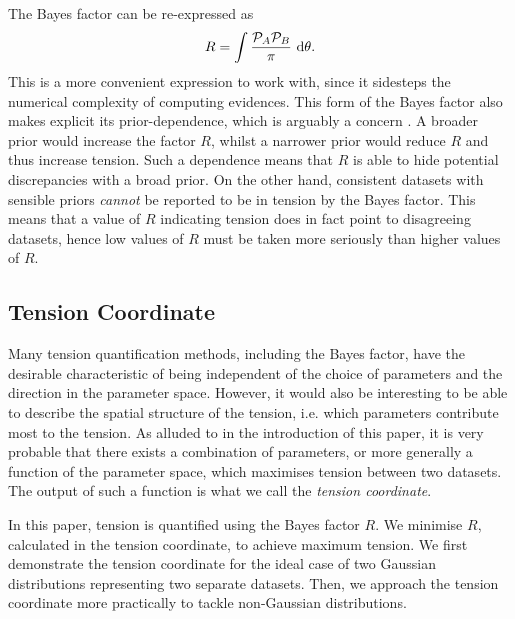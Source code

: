 \documentclass[%
 reprint,
 amsmath,amssymb,
 aps,
]{revtex4-2}
\begin{document}
The Bayes factor can be re-expressed as 
\begin{equation}
    R = \int \frac{\mathcal{P}_A \mathcal{P}_B}{\pi} \ \rm{d}\theta.
\end{equation}
This is a more convenient expression to work with, since it sidesteps the numerical complexity of computing evidences. This form of the Bayes factor also makes explicit its prior-dependence, which is arguably a concern \cite{Handley2019}. A broader prior would increase the factor $R$, whilst a narrower prior would reduce $R$ and thus increase tension. Such a dependence means that $R$ is able to hide potential discrepancies with a broad prior. On the other hand, consistent datasets with sensible priors \textit{cannot} be reported to be in tension by the Bayes factor. This means that a value of $R$ indicating tension does in fact point to disagreeing datasets, hence low values of $R$ must be taken more seriously than higher values of $R$.


\subsection{Tension Coordinate}

Many tension quantification methods, including the Bayes factor, have the desirable characteristic of being independent of the choice of parameters and the direction in the parameter space. However, it would also be interesting to be able to describe the spatial structure of the tension, i.e. which parameters contribute most to the tension. As alluded to in the introduction of this paper, it is very probable that there exists a combination of parameters, or more generally a function of the parameter space, which maximises tension between two datasets. The output of such a function is what we call the \textit{tension coordinate}. 



In this paper, tension is quantified using the Bayes factor $R$. We minimise $R$, calculated in the tension coordinate, to achieve maximum tension. We first demonstrate the tension coordinate for the ideal case of two Gaussian distributions representing two separate datasets. Then, we approach the tension coordinate more practically to tackle non-Gaussian distributions.
\end{document}
